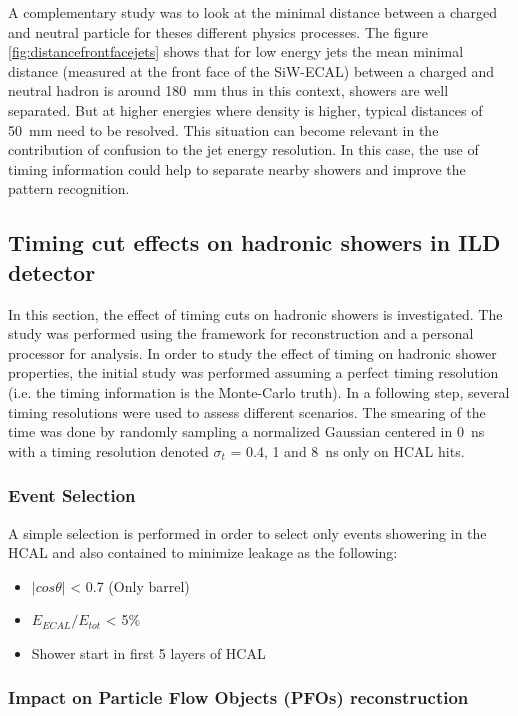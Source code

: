 A complementary study was to look at the minimal distance between a charged and neutral particle for theses different physics processes. The figure \ref{fig:distancefrontfacejets} shows that for low energy jets the mean minimal distance (measured at the front face of the SiW-ECAL) between a charged and neutral hadron is around \SI{180}{\milli\meter} thus in this context, showers are well separated. But at higher energies where density is higher, typical distances of \SI{50}{\milli\meter} need to be resolved. This situation can become relevant in the contribution of confusion to the jet energy resolution. In this case, the use of timing information could help to separate nearby showers and improve the pattern recognition.

\subsection{Timing cut effects on hadronic showers in ILD detector}

In this section, the effect of timing cuts on hadronic showers is investigated. The study was performed using the \ilcsoft framework for reconstruction and a personal \marlin processor for analysis. In order to study the effect of timing on hadronic shower properties, the initial study was performed assuming a perfect timing resolution (i.e. the timing information is the Monte-Carlo truth). In a following step, several timing resolutions were used to assess different scenarios. The smearing of the time was done by randomly sampling a normalized Gaussian centered in \SI{0}{\nano\second} with a timing resolution denoted $\sigma_{t}$ = 0.4, 1 and \SI{8}{\nano\second} only on HCAL hits.

\subsubsection{Event Selection}

A simple selection is performed in order to select only events showering in the HCAL and also contained to minimize leakage as the following:
\begin{itemize}
  \item $|cos\theta|$ < 0.7 (Only barrel)
  \item $E_{ECAL}/E_{tot}$ < 5\%
  \item Shower start in first 5 layers of HCAL
\end{itemize}

\subsubsection{Impact on Particle Flow Objects (PFOs) reconstruction}

